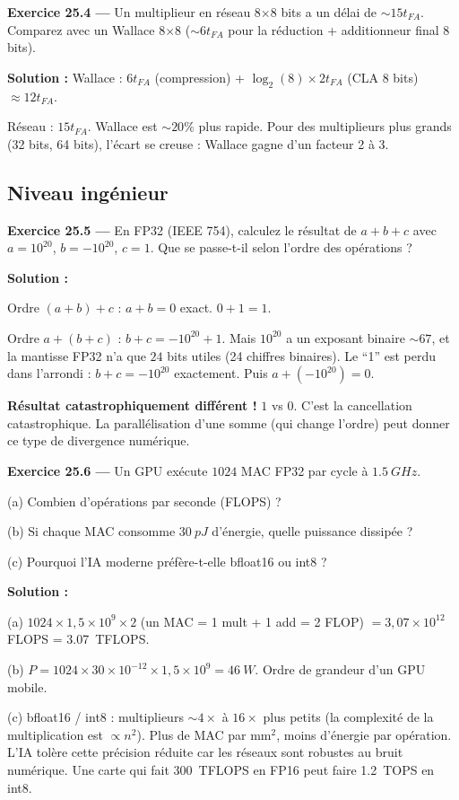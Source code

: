 \documentclass[12pt,a4paper,twoside]{book}
\begin{document}
\textbf{Exercice 25.4 ---} Un multiplieur en réseau 8$\times$8 bits a un délai de $\sim 15 t_{FA}$. Comparez avec un Wallace 8$\times$8 ($\sim 6 t_{FA}$ pour la réduction + additionneur final 8 bits).

\begin{pratique}
\textbf{Solution :} Wallace : $6 t_{FA}$ (compression) + $\log_2(8) \times 2 t_{FA}$ (CLA 8 bits) $\approx 12 t_{FA}$.

Réseau : $15 t_{FA}$. Wallace est $\sim 20\%$ plus rapide. Pour des multiplieurs plus grands (32 bits, 64 bits), l'écart se creuse : Wallace gagne d'un facteur 2 à 3.
\end{pratique}

\subsection*{Niveau ingénieur}

\textbf{Exercice 25.5 ---} En FP32 (IEEE 754), calculez le résultat de $a + b + c$ avec $a = 10^{20}$, $b = -10^{20}$, $c = 1$. Que se passe-t-il selon l'ordre des opérations ?

\begin{pratique}
\textbf{Solution :}

Ordre $(a + b) + c$ : $a + b = 0$ exact. $0 + 1 = 1$. \checkmark

Ordre $a + (b + c)$ : $b + c = -10^{20} + 1$. Mais $10^{20}$ a un exposant binaire $\sim 67$, et la mantisse FP32 n'a que $24$ bits utiles (24 chiffres binaires). Le ``1'' est perdu dans l'arrondi : $b + c = -10^{20}$ exactement. Puis $a + (-10^{20}) = 0$.

\textbf{Résultat catastrophiquement différent !} $1$ vs $0$. C'est la cancellation catastrophique. La parallélisation d'une somme (qui change l'ordre) peut donner ce type de divergence numérique.
\end{pratique}

\textbf{Exercice 25.6 ---} Un GPU exécute $1024$ MAC FP32 par cycle à $\SI{1.5}{GHz}$.

(a) Combien d'opérations par seconde (FLOPS) ?

(b) Si chaque MAC consomme $\SI{30}{pJ}$ d'énergie, quelle puissance dissipée ?

(c) Pourquoi l'IA moderne préfère-t-elle bfloat16 ou int8 ?

\begin{pratique}
\textbf{Solution :}

(a) $1024 \times 1{,}5\times10^9 \times 2$ (un MAC = 1 mult + 1 add = 2 FLOP) $= 3{,}07\times10^{12}$ FLOPS = \SI{3.07}{TFLOPS}.

(b) $P = 1024 \times 30\times10^{-12} \times 1{,}5\times10^9 = \SI{46}{W}$. Ordre de grandeur d'un GPU mobile.

(c) bfloat16 / int8 : multiplieurs $\sim 4\times$ à $16\times$ plus petits (la complexité de la multiplication est $\propto n^2$). Plus de MAC par mm$^2$, moins d'énergie par opération. L'IA tolère cette précision réduite car les réseaux sont robustes au bruit numérique. Une carte qui fait \SI{300}{TFLOPS} en FP16 peut faire \SI{1.2}{TOPS} en int8.
\end{pratique}
\end{document}
